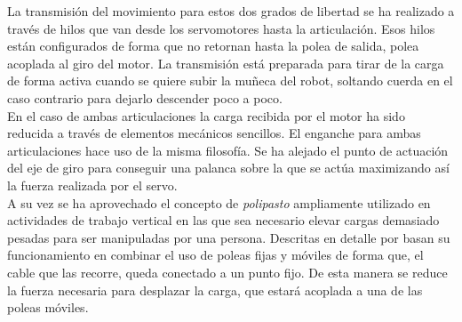     La transmisión del movimiento para estos dos grados de libertad se ha realizado a través de hilos que van desde los servomotores hasta la articulación. Esos hilos están configurados de forma que no retornan hasta la polea de salida, polea acoplada al giro del motor. La transmisión está preparada para tirar de la carga de forma activa cuando se quiere subir la muñeca del robot, soltando cuerda en el caso contrario para dejarlo descender poco a poco.
	\\

    En el caso de ambas articulaciones la carga recibida por el motor ha sido reducida a través de elementos mecánicos sencillos. El enganche para ambas articulaciones hace uso de la misma filosofía. Se ha alejado el punto de actuación del eje de giro para conseguir una palanca sobre la que se actúa maximizando así la fuerza realizada por el servo.
    \\

    A su vez se ha aprovechado el concepto de \textit{polipasto} ampliamente utilizado en actividades de trabajo vertical en las que sea necesario elevar cargas demasiado pesadas para ser manipuladas por una persona. Descritas en detalle por \cite{granvertical} basan su funcionamiento en combinar el uso de poleas fijas y móviles de forma que, el cable que las recorre, queda conectado a un punto fijo. De esta manera se reduce la fuerza necesaria para desplazar la carga, que estará acoplada a una de las poleas móviles.


